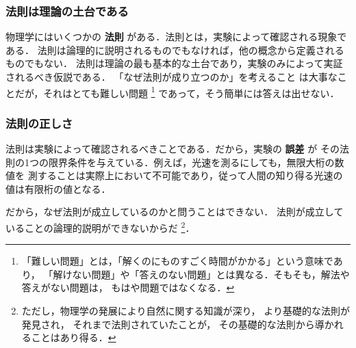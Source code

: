             \subsubsection{法則は理論の土台である}
            物理学にはいくつかの \textbf{法則} がある．法則とは，実験によって確認される現象である．
            法則は論理的に説明されるものでもなければ，他の概念から定義されるものでもない．
            法則は理論の最も基本的な土台であり，実験のみによって実証されるべき仮説である．
            「なぜ法則が成り立つのか」を考えること は大事なことだが，それはとても難しい問題
                \footnote{
                    「難しい問題」とは，「解くのにものすごく時間がかかる」という意味であり，
                    「解けない問題」や「答えのない問題」とは異なる．そもそも，解法や答えがない問題は，
                    もはや問題ではなくなる．
                }
            であって，そう簡単には答えは出せない．

            \subsubsection{法則の正しさ}
            法則は実験によって確認されるべきことである．だから，実験の \textbf{誤差} が
            その法則の1つの限界条件を与えている．例えば，光速を測るにしても，無限大桁の数値を
            測することは実際上において不可能であり，従って人間の知り得る光速の値は有限桁の値となる．

            だから，なぜ法則が成立しているのかと問うことはできない．
            法則が成立していることの論理的説明ができないからだ
                \footnote{
                    ただし，物理学の発展により自然に関する知識が深り，
                    より基礎的な法則が発見され，
                    それまで法則されていたことが，
                    その基礎的な法則から導かれることはあり得る．
                }．

